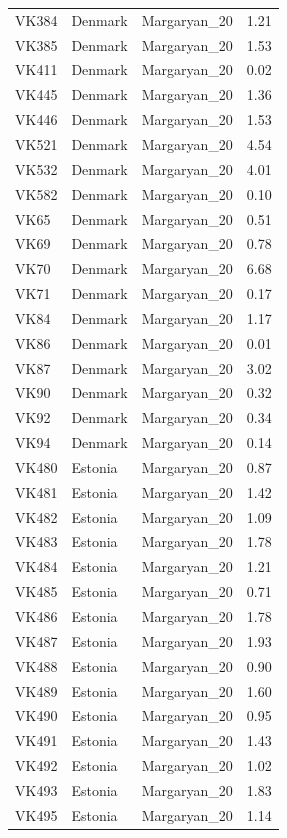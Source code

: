 \begin{longtable}[t]{lllr}
VK384 & Denmark & Margaryan\_20 & 1.21\\
VK385 & Denmark & Margaryan\_20 & 1.53\\
VK411 & Denmark & Margaryan\_20 & 0.02\\
VK445 & Denmark & Margaryan\_20 & 1.36\\
VK446 & Denmark & Margaryan\_20 & 1.53\\
VK521 & Denmark & Margaryan\_20 & 4.54\\
VK532 & Denmark & Margaryan\_20 & 4.01\\
VK582 & Denmark & Margaryan\_20 & 0.10\\
VK65 & Denmark & Margaryan\_20 & 0.51\\
VK69 & Denmark & Margaryan\_20 & 0.78\\
VK70 & Denmark & Margaryan\_20 & 6.68\\
VK71 & Denmark & Margaryan\_20 & 0.17\\
VK84 & Denmark & Margaryan\_20 & 1.17\\
VK86 & Denmark & Margaryan\_20 & 0.01\\
VK87 & Denmark & Margaryan\_20 & 3.02\\
VK90 & Denmark & Margaryan\_20 & 0.32\\
VK92 & Denmark & Margaryan\_20 & 0.34\\
VK94 & Denmark & Margaryan\_20 & 0.14\\
VK480 & Estonia & Margaryan\_20 & 0.87\\
VK481 & Estonia & Margaryan\_20 & 1.42\\
VK482 & Estonia & Margaryan\_20 & 1.09\\
VK483 & Estonia & Margaryan\_20 & 1.78\\
VK484 & Estonia & Margaryan\_20 & 1.21\\
VK485 & Estonia & Margaryan\_20 & 0.71\\
VK486 & Estonia & Margaryan\_20 & 1.78\\
VK487 & Estonia & Margaryan\_20 & 1.93\\
VK488 & Estonia & Margaryan\_20 & 0.90\\
VK489 & Estonia & Margaryan\_20 & 1.60\\
VK490 & Estonia & Margaryan\_20 & 0.95\\
VK491 & Estonia & Margaryan\_20 & 1.43\\
VK492 & Estonia & Margaryan\_20 & 1.02\\
VK493 & Estonia & Margaryan\_20 & 1.83\\
VK495 & Estonia & Margaryan\_20 & 1.14\\

\end{longtable}

